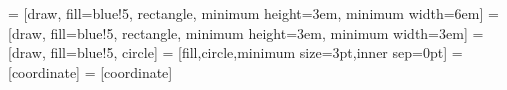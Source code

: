  = [draw, fill=blue!5, rectangle, 
    minimum height=3em, minimum width=6em]
 = [draw, fill=blue!5, rectangle, 
    minimum height=3em, minimum width=3em]
 = [draw, fill=blue!5, circle]
 = [fill,circle,minimum size=3pt,inner sep=0pt]
 = [coordinate]
 = [coordinate]
